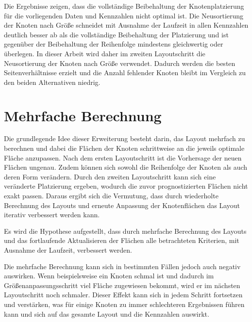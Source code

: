 Die Ergebnisse zeigen, dass die vollständige Beibehaltung der Knotenplatzierung für die vorliegenden Daten und Kennzahlen nicht optimal ist. Die Neusortierung der Knoten nach Größe schneidet mit Ausnahme der Laufzeit in allen Kennzahlen deutlich besser ab als die vollständige Beibehaltung der Platzierung und ist gegenüber der Beibehaltung der Reihenfolge mindestens gleichwertig oder überlegen. In dieser Arbeit wird daher im zweiten Layoutschritt die Neusortierung der Knoten nach Größe verwendet. Dadurch werden die besten Seitenverhältnisse erzielt und die Anzahl fehlender Knoten bleibt im Vergleich zu den beiden Alternativen niedrig.

\section{Mehrfache Berechnung} \label{sec:MehrfacheBerechnung}

Die grundlegende Idee dieser Erweiterung besteht darin, das Layout mehrfach zu berechnen und dabei die Flächen der Knoten schrittweise an die jeweils optimale Fläche anzupassen. Nach dem ersten Layoutschritt ist die Vorhersage der neuen Flächen ungenau. Zudem können sich sowohl die Reihenfolge der Knoten als auch deren Form verändern. Durch den zweiten Layoutschritt kann sich eine veränderte Platzierung ergeben, wodurch die zuvor prognostizierten Flächen nicht exakt passen. Daraus ergibt sich die Vermutung, dass durch wiederholte Berechnung des Layouts und erneute Anpassung der Knotenflächen das Layout iterativ verbessert werden kann.

Es wird die Hypothese aufgestellt, dass durch mehrfache Berechnung des Layouts und das fortlaufende Aktualisieren der Flächen alle betrachteten Kriterien, mit Ausnahme der Laufzeit, verbessert werden.

Die mehrfache Berechnung kann sich in bestimmten Fällen jedoch auch negativ auswirken. Wenn beispielsweise ein Knoten schmal ist und dadurch im Größenanpassungsschritt viel Fläche zugewiesen bekommt, wird er im nächsten Layoutschritt noch schmaler. Dieser Effekt kann sich in jedem Schritt fortsetzen und verstärken, was für einige Knoten zu immer schlechteren Ergebnissen führen kann und sich auf das gesamte Layout und die Kennzahlen auswirkt.

